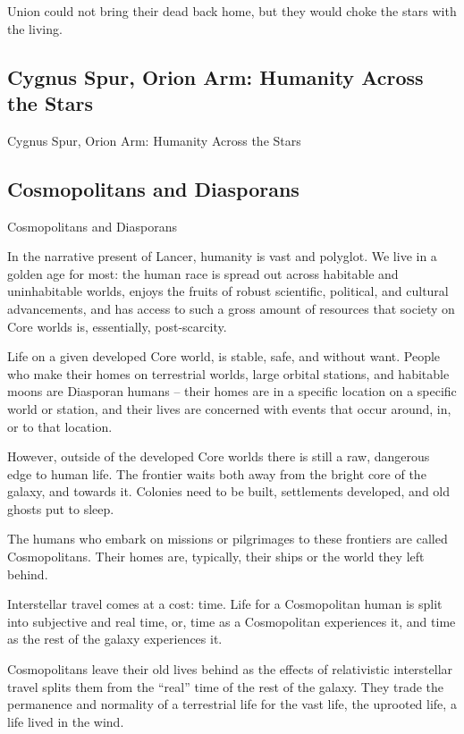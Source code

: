 Union could not bring their dead back home, but they would choke the stars with the living.

\subsection{Cygnus Spur, Orion Arm: Humanity Across the Stars}

Cygnus Spur, Orion Arm: Humanity
Across the Stars

\subsection{Cosmopolitans and Diasporans}
Cosmopolitans and Diasporans

In the narrative present of Lancer, humanity is vast and polyglot. We live in a golden age
for most: the human race is spread out across habitable and uninhabitable worlds, enjoys the
fruits of robust scientific, political, and cultural advancements, and has access to such a gross
amount of resources that society on Core worlds is, essentially, post-scarcity.


Life on a given developed Core world, is stable, safe, and without want. People who make their
homes on terrestrial worlds, large orbital stations, and habitable moons are Diasporan humans --
their homes are in a specific location on a specific world or station, and their lives are concerned
with events that occur around, in, or to that location.


However, outside of the developed Core worlds there is still a raw, dangerous edge to human life.
The frontier waits both away from the bright core of the galaxy, and towards it. Colonies need to
be built, settlements developed, and old ghosts put to sleep.


The humans who embark on missions or pilgrimages to these frontiers are called Cosmopolitans.
Their homes are, typically, their ships or the world they left behind.


Interstellar travel comes at a cost: time. Life for a Cosmopolitan human is split into subjective
and real time, or, time as a Cosmopolitan experiences it, and time as the rest of the galaxy
experiences it.


Cosmopolitans leave their old lives behind as the effects of relativistic interstellar travel splits
them from the “real” time of the rest of the galaxy. They trade the permanence and normality of a
terrestrial life for the vast life, the uprooted life, a life lived in the wind.


